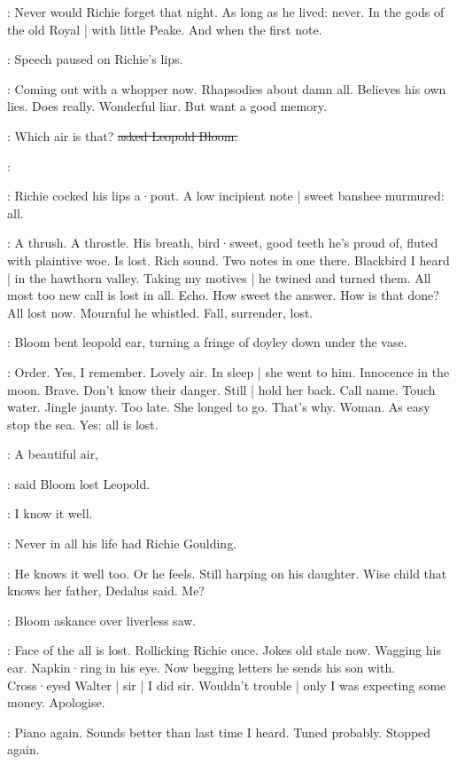 :
Never would Richie forget that night.
As long as he lived:
never.
In the gods of the old Royal |
with little Peake.
And when the first note.

:
Speech paused on Richie's lips.

\BloomInt:
Coming out with a whopper now.
Rhapsodies about damn all.
Believes his own lies.
Does really.
Wonderful liar.
But want a good memory.

\Bloom:
Which air is that?
\sout{asked Leopold Bloom.}

\goulding:

:
Richie cocked his lips a·pout.
A low incipient note |
sweet banshee murmured:
all.

\BloomInt:
A thrush.
A throstle.
His breath,
bird·sweet,
good teeth he's proud of,
fluted with plaintive woe.
Is lost.
Rich sound.
Two notes in one there.
Blackbird I heard |
in the hawthorn valley.
Taking my motives |
he twined and turned them.
All most too new call is lost in all.
Echo.
How sweet the answer.
How is that done?
All lost now.
Mournful he whistled.
Fall,
surrender,
lost.

:
Bloom bent leopold ear,
turning a fringe of doyley down under the vase.

\BloomInt:
Order.
Yes,
I remember.
Lovely air.
In sleep |
she went to him.
Innocence in the moon.
Brave.
Don't know their danger.
Still |
hold her back.
Call name.
Touch water.
Jingle jaunty.
Too late.
She longed to go.
That's why.
Woman.
As easy stop the sea.
Yes:
all is lost.

\Bloom:
A beautiful air,

:
said Bloom lost Leopold.

\Bloom:
I know it well.

:
Never in all his life had Richie Goulding.

\BloomInt:
He knows it well too.
Or he feels.
Still harping on his daughter.
Wise child that knows her father,
Dedalus said.
Me?

:
Bloom askance over liverless saw.

\BloomInt:
Face of the all is lost.
Rollicking
Richie once.
Jokes old stale now.
Wagging his ear.
Napkin·ring in his eye.
Now begging letters he sends his son with.
Cross·eyed Walter |
sir |
I did sir.
Wouldn't trouble |
only I was expecting some money.
Apologise.

\BloomInt:
Piano again.
Sounds better than last time I heard.
Tuned probably.
Stopped again.


